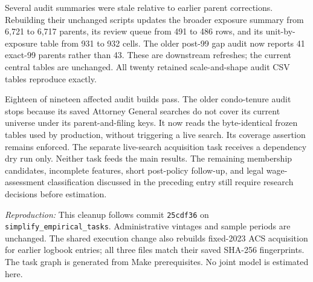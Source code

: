 Several audit summaries were stale relative to earlier parent corrections. Rebuilding their unchanged scripts updates the broader exposure summary from 6,721 to 6,717 parents, its review queue from 491 to 486 rows, and its unit-by-exposure table from 931 to 932 cells. The older post-99 gap audit now reports 41 exact-99 parents rather than 43. These are downstream refreshes; the current central tables are unchanged. All twenty retained scale-and-shape audit CSV tables reproduce exactly.

Eighteen of nineteen affected audit builds pass. The older condo-tenure audit stops because its saved Attorney General searches do not cover its current universe under its parent-and-filing keys. It now reads the byte-identical frozen tables used by production, without triggering a live search. Its coverage assertion remains enforced. The separate live-search acquisition task receives a dependency dry run only. Neither task feeds the main results. The remaining membership candidates, incomplete features, short post-policy follow-up, and legal wage-assessment classification discussed in the preceding entry still require research decisions before estimation.

\textit{Reproduction:} This cleanup follows commit \texttt{25cdf36} on \texttt{simplify\_empirical\_tasks}. Administrative vintages and sample periods are unchanged. The shared execution change also rebuilds fixed-2023 ACS acquisition for earlier logbook entries; all three files match their saved SHA-256 fingerprints. The task graph is generated from Make prerequisites. No joint model is estimated here.
